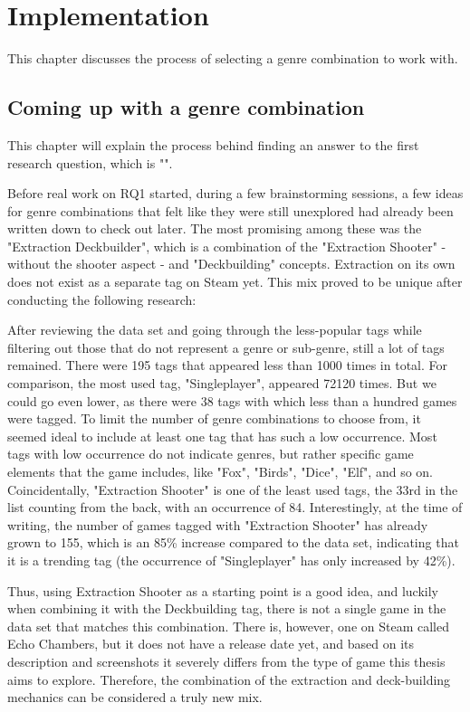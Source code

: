 \chapter{Implementation} \label{Chapter:Implementation}


This chapter discusses the process of selecting a genre combination to work with.


\section{Coming up with a genre combination} %

This chapter will explain the process behind finding an answer to the first research question, which is "\textit{\researchQuestionOne}".

Before real work on RQ1 started, during a few brainstorming sessions, a few ideas for genre combinations that felt like they were still unexplored had already been written down to check out later. The most promising among these was the "Extraction Deckbuilder", which is a combination of the "Extraction Shooter" - without the shooter aspect - and "Deckbuilding" concepts. Extraction on its own does not exist as a separate tag on Steam yet. This mix proved to be unique after conducting the following research:

After reviewing the data set and going through the less-popular tags while filtering out those that do not represent a genre or sub-genre, still a lot of tags remained. There were 195 tags that appeared less than 1000 times in total. For comparison, the most used tag, "Singleplayer", appeared 72120 times. But we could go even lower, as there were 38 tags with which less than a hundred games were tagged. To limit the number of genre combinations to choose from, it seemed ideal to include at least one tag that has such a low occurrence. Most tags with low occurrence do not indicate genres, but rather specific game elements that the game includes, like "Fox", "Birds", "Dice", "Elf", and so on. Coincidentally, "Extraction Shooter" is one of the least used tags, the 33rd in the list counting from the back, with an occurrence of 84. Interestingly, at the time of writing, the number of games tagged with "Extraction Shooter" has already grown to 155, which is an 85\% increase compared to the data set, indicating that it is a trending tag (the occurrence of "Singleplayer" has only increased by 42\%).

Thus, using Extraction Shooter as a starting point is a good idea, and luckily when combining it with the Deckbuilding tag, there is not a single game in the data set that matches this combination. There is, however, one on Steam called Echo Chambers, but it does not have a release date yet, and based on its description and screenshots it severely differs from the type of game this thesis aims to explore. Therefore, the combination of the extraction and deck-building mechanics can be considered a truly new mix.



